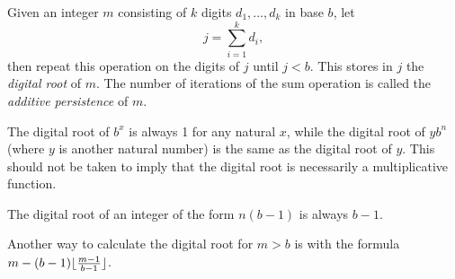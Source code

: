 \documentclass[12pt]{article}
\begin{document}
Given an integer $m$ consisting of $k$ digits $d_1, \dots, d_k$ in base $b$, let $$j = \sum_{i = 1}^{k} d_i,$$ then repeat this operation on the digits of $j$ until $j < b$. This stores in $j$ the {\em digital root} of $m$. The number of iterations of the sum operation is called the {\em additive persistence} of $m$.

The digital root of $b^x$ is always 1 for any natural $x$, while the digital root of $yb^n$ (where $y$ is another natural number) is the same as the digital root of $y$. This should not be taken to imply that the digital root is necessarily a multiplicative function.

The digital root of an integer of the form $n(b - 1)$ is always $b - 1$. 

Another way to calculate the digital root for $m > b$ is with the formula $m - (b - 1)\lfloor {{m - 1} \over {b - 1}} \rfloor$.
\end{document}
